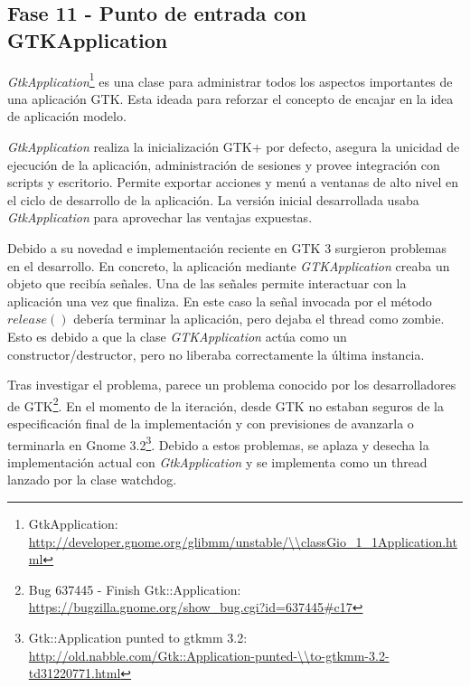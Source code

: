 \subsection{Fase 11 - Punto de entrada con GTKApplication}

\emph{GtkApplication}\footnote{GtkApplication:\\
\url{http://developer.gnome.org/glibmm/unstable/\\classGio\_1\_1Application.html}\label{ftn:GtkApplication}}
es una clase para administrar todos los aspectos importantes de
una aplicación GTK. Esta ideada para reforzar el concepto de encajar en la
idea de aplicación modelo.

\emph{GtkApplication} realiza la inicialización GTK+ por defecto, asegura la
unicidad de ejecución de la aplicación, administración de sesiones y provee integración con
scripts y escritorio. Permite exportar acciones y menú a ventanas de alto nivel
en el ciclo de desarrollo de la aplicación. La versión inicial desarrollada
usaba \emph{GtkApplication} para aprovechar las ventajas expuestas.

Debido a su novedad e implementación reciente en GTK 3 surgieron problemas en el
desarrollo. En concreto, la aplicación mediante \emph{GTKApplication} creaba un
objeto que recibía señales. Una de las señales permite interactuar con la aplicación
una vez que finaliza. En este caso la señal invocada por el método $release()$
debería terminar la aplicación, pero dejaba el thread como zombie. Esto es
debido a que la clase \emph{GTKApplication} actúa como un
constructor/destructor, pero no liberaba correctamente la última instancia.

Tras investigar el problema, parece un problema conocido por los desarrolladores
de GTK\footnote{Bug 637445 - Finish Gtk::Application:\\
\url{https://bugzilla.gnome.org/show\_bug.cgi?id=637445\#c17}\label{ftn:GtkBugzilla}}.
En el momento de la iteración, desde GTK no estaban seguros de la especificación final de la implementación y con previsiones de avanzarla o terminarla en Gnome
3.2\footnote{Gtk::Application punted to gtkmm 3.2:\\
\url{http://old.nabble.com/Gtk::Application-punted-\\to-gtkmm-3.2-td31220771.html}\label{ftn:Application-punted}}.
Debido a estos problemas, se aplaza y desecha la implementación actual con \emph{GtkApplication} y se implementa como un thread lanzado por la clase
watchdog.

\newpage

